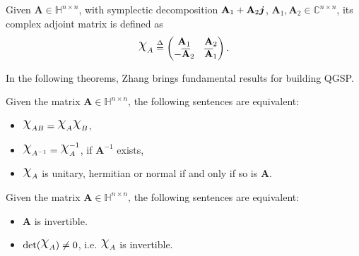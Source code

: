 \begin{definition}
Given $ \mathbf{A} \in \mathbb{H}^{n \times n} $, with symplectic decomposition $ \mathbf{A}_1 + \mathbf{A}_2 \boldsymbol{j}$, $ \mathbf{A}_1,\mathbf{A}_2 \in \mathbb{C}^{n \times n} $, its complex adjoint matrix is defined as
\begin{equation}
\rchi_{A} \overset{\Delta}{=}
\begin{pmatrix}
\mathbf{A}_1 & \mathbf{A}_2\\ 
- \overline{\mathbf{A}}_2 & \overline{\mathbf{A}}_1
\end{pmatrix}.
\end{equation}
\end{definition}

In the following theorems, Zhang brings fundamental results for building QGSP.

\begin{theorem}
\label{th:equiv01}
Given the matrix $ \mathbf{A} \in \mathbb{H}^{n \times n} $, the following sentences are equivalent:

\begin{itemize}[noitemsep]
\item $ \rchi_{AB} = \rchi_{A} \rchi_{B} $,
\item $ \rchi_{A^{-1}} = \rchi_{A}^{-1}$, if $ \mathbf{A}^{-1} $ exists,
\item $ \rchi_{A}$ is unitary, hermitian or normal if and only if so is $ \mathbf{A} $.
\end{itemize}

\end{theorem}

\begin{theorem}
\label{th:equiv02}
Given the matrix $ \mathbf{A} \in \mathbb{H}^{n \times n} $, the following sentences are equivalent:

\begin{itemize}[noitemsep]
\item $\mathbf{A}$ is invertible.
\item $\mathrm{det}(\rchi_A) \neq 0$, i.e. $\rchi_{A}$ is invertible.
\end{itemize}

\end{theorem}



